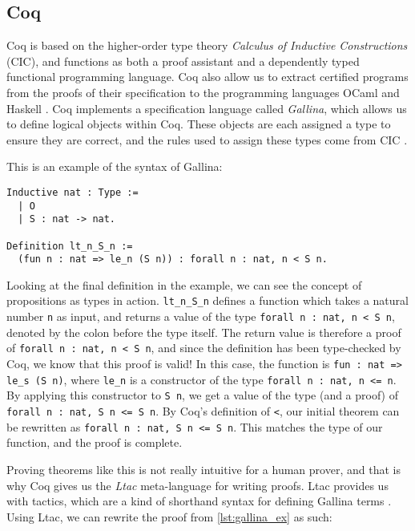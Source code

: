 \subsection{Coq}
\label{ssec:coq}

Coq is based on the higher-order type theory \emph{Calculus of Inductive Constructions} (CIC), and
functions as both a proof assistant and a dependently typed functional programming language.
Coq also allow us to extract certified programs from the proofs of their specification to
the programming languages OCaml and Haskell \cite{cintro}.
Coq implements a specification language called \emph{Gallina},
which allows us to define logical objects within Coq.
These objects are each assigned a type to ensure they are correct,
and the rules used to assign these types come from CIC \cite{cic}.

This is an example of the syntax of Gallina:

\begin{minipage}{\linewidth}
\begin{lstlisting}[language=Coq, label={lst:gallina_ex}, caption={Example of Gallina syntax}]
Inductive nat : Type :=
  | O
  | S : nat -> nat.

Definition lt_n_S_n :=
  (fun n : nat => le_n (S n)) : forall n : nat, n < S n.
\end{lstlisting}
\end{minipage}

Looking at the final definition in the example, we can see the
concept of propositions as types in action.
\lstinline{lt_n_S_n} defines a function which takes a natural number \lstinline{n}
as input, and returns a value of the type \lstinline{forall n : nat, n < S n},
denoted by the colon before the type itself.
The return value is therefore a proof of \lstinline{forall n : nat, n < S n}, and since
the definition has been type-checked by Coq, we know that this proof is valid!
In this case, the function is
\lstinline{fun : nat => le_s (S n)}, where \lstinline{le_n} is a constructor
of the type \lstinline{forall n : nat, n <= n}. By applying this constructor
to \lstinline{S n}, we get a value of the type (and a proof) of
\lstinline{forall n : nat, S n <= S n}.
By Coq's definition of \lstinline{<},
our initial theorem can be rewritten as \lstinline{forall n : nat, S n <= S n}.
This matches the type of our function, and the proof is complete.

Proving theorems like this is not really intuitive for a human prover,
and that is why Coq gives us the \emph{Ltac} meta-language for writing proofs.
Ltac provides us with tactics, which are a kind of shorthand syntax for defining Gallina terms \cite{cltac}.
Using Ltac, we can rewrite the proof from \ref{lst:gallina_ex} as such:

